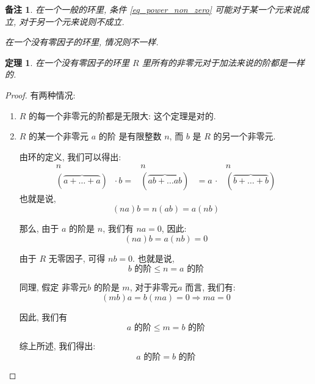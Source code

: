 \documentclass[utf8]{ctexbook}
\newtheorem{theorem}{定理}[section]
\newtheorem{memo}{备注}[section]
\begin{document}
\begin{memo}
在一个一般的环里, 条件 \ref{eq_power_non_zero} 可能对于某一个元来说成立, 对于另一个元来说则不成立.

在一个没有零因子的环里, 情况则不一样.
\end{memo}

\begin{theorem}
在一个没有零因子的环里 $R$ 里所有的非零元对于加法来说的阶都是一样的.
\end{theorem}

\begin{proof}
有两种情况:
\begin{enumerate}
\item{$R$ 的每一个非零元的阶都是无限大: 这个定理是对的.}
\item{$R$ 的某一个非零元 $a$ 的阶 是有限整数 $n$, 而 $b$ 是 $R$ 的另一个非零元. 

由环的定义, 我们可以得出:
\begin{equation}
\begin{array}{ccccc}
n & & n & & n \\ 
(\overbrace{a + \ldots + a} ) & \cdot \, b = & (\overbrace{ab + \ldots ab}) & = a \, \cdot & (\overbrace{b + \ldots + b}) 
\end{array}
\end{equation}
也就是说,
\begin{equation}
(na)b = n(ab) = a (nb)
\end{equation}

那么, 由于 $a$ 的阶是 $n$, 我们有 $na = 0$, 因此:
\begin{equation}
(na)b = a(nb) = 0
\end{equation}

由于 $R$ 无零因子, 可得 $nb=0$. 也就是说,
\begin{equation}
b \mbox{ 的阶} \leq n = a \mbox{ 的阶}
\end{equation}

同理, 假定 非零元$b$ 的阶是 $m$, 对于非零元$a$ 而言, 我们有:
\begin{equation}
(mb)a = b(ma) = 0 \Rightarrow ma = 0
\end{equation}

因此, 我们有
\begin{equation}
a \mbox{ 的阶} \leq m = b \mbox{ 的阶}
\end{equation}

综上所述, 我们得出:
\begin{equation}
a \mbox{ 的阶} = b \mbox{ 的阶}
\end{equation}
}
\end{enumerate}
\end{proof}
\end{document}
